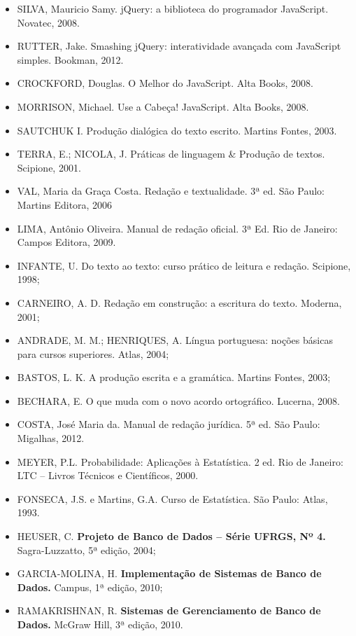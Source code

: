 \begin{itemize}
    \item SILVA, Mauricio Samy.
          jQuery: a biblioteca do programador JavaScript.
          Novatec, 2008.

    \item RUTTER, Jake.
          Smashing jQuery: interatividade avançada com JavaScript simples.
          Bookman, 2012.

    \item CROCKFORD, Douglas.
          O Melhor do JavaScript.
          Alta Books, 2008.

    \item MORRISON, Michael.
          Use a Cabeça! JavaScript.
          Alta Books, 2008.
	\item SAUTCHUK I. Produção dialógica do texto escrito. Martins Fontes, 2003.
	\item TERRA, E.; NICOLA, J. Práticas de linguagem \& Produção de textos. Scipione, 2001.
	\item VAL, Maria da Graça Costa. Redação e textualidade. 3ª ed. São Paulo: Martins Editora, 2006
	\item LIMA, Antônio Oliveira. Manual de redação oficial. 3ª Ed. Rio de Janeiro: Campos Editora, 2009.
	\item INFANTE, U. Do texto ao texto: curso prático de leitura e redação. Scipione, 1998; 
	\item CARNEIRO, A. D. Redação em construção: a escritura do texto. Moderna, 2001;
	\item ANDRADE, M. M.; HENRIQUES, A. Língua portuguesa: noções básicas para cursos superiores. Atlas, 2004;
	\item BASTOS, L. K. A produção escrita e a gramática. Martins Fontes, 2003;
	\item BECHARA, E. O que muda com o novo acordo ortográfico. Lucerna, 2008.
	\item COSTA, José Maria da. Manual de redação jurídica. 5ª ed. São Paulo: Migalhas, 2012.
	\item MEYER, P.L. Probabilidade: Aplicações à Estatística. 2 ed.  Rio de Janeiro: LTC – Livros Técnicos e Científicos, 2000.
	\item FONSECA, J.S. e Martins, G.A. Curso de Estatística. São Paulo: Atlas, 1993.
	\item 	HEUSER, C. \textbf{Projeto de Banco de Dados – Série UFRGS, Nº 4.} Sagra-Luzzatto, 5ª edição, 2004;
	\item 	GARCIA-MOLINA, H. \textbf{Implementação de Sistemas de Banco de Dados.} Campus, 1ª edição, 2010;
    \item 	RAMAKRISHNAN, R. \textbf{Sistemas de Gerenciamento de Banco de Dados.} McGraw Hill, 3ª edição, 2010.

\end{itemize}
